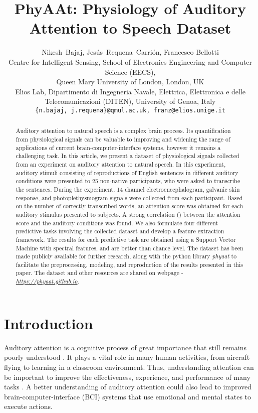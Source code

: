 \documentclass{article}
\title{PhyAAt: \textbf{Phy}siology of \textbf{A}uditory \textbf{At}tention to Speech Dataset}
\date{}
\author{
  Nikesh~Bajaj, Jes\'us~Requena~Carri\'on, Francesco Bellotti\\
  Centre for Intelligent Sensing, School of Electronics Engineering and Computer Science (EECS),\\
  Queen Mary University of London, London, UK\\
  Elios Lab, Dipartimento di Ingegneria Navale, Elettrica, Elettronica e delle\\ Telecomunicazioni (DITEN), University of Genoa, Italy\\
  \texttt{\{n.bajaj, j.requena\}@qmul.ac.uk, franz@elios.unige.it}\\
}
\begin{document}
\maketitle

\begin{abstract}
Auditory attention to natural speech is a complex brain process. Its quantification from physiological signals can be valuable to improving and widening the range of applications of current brain-computer-interface systems, however it remains a challenging task. In this article, we present a dataset of physiological signals collected from an experiment on auditory attention to natural speech. In this experiment, auditory stimuli consisting of reproductions of English sentences in different auditory conditions were presented to 25 non-native participants, who were asked to transcribe the sentences. During the experiment, 14 channel electroencephalogram, galvanic skin response, and photoplethysmogram signals were collected from each participant. Based on the number of correctly transcribed words, an attention score was obtained for each auditory stimulus presented to subjects. A strong correlation () between the attention score and the auditory conditions was found. We also formulate four different predictive tasks involving the collected dataset and develop a feature extraction framework. The results for each predictive task are obtained using a Support Vector Machine with spectral features, and are better than chance level. The dataset has been made publicly available for further research, along with the python library \textit{phyaat} to facilitate the preprocessing, modeling, and reproduction of the results presented in this paper. The dataset and other resources are shared on webpage - \href{https://phyaat.github.io}{{\it https://phyaat.github.io}}.









\end{abstract}



\section{Introduction}
\label{S:Intro}
Auditory attention is a cognitive process of great importance that still remains poorly understood \cite{AudAtten2000}. It plays a vital role in many human activities, from aircraft flying to learning in a classroom environment. Thus, understanding attention can be important to improve the effectiveness, experience, and performance of many tasks \cite{SelAtte2001}. 
A better understanding of auditory attention could also lead to improved brain-computer-interface (BCI) systems that use emotional and mental states to execute actions.
\end{document}
